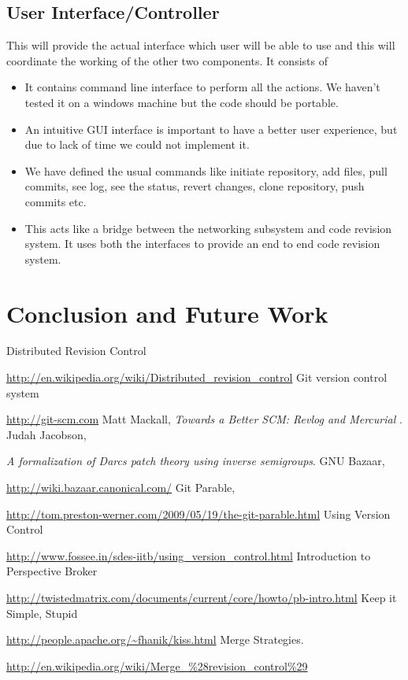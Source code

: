 \documentclass[12pt]{article}
\begin{document}
\subsection{User Interface/Controller}
This will provide the actual interface which user will be able to use and this
will coordinate the working of the other two components.
It consists of
\begin{itemize}
\item It contains command line interface to perform all the actions. We
  haven't tested it on a windows machine but the code should be portable.
\item An intuitive GUI interface is important to have a better user
  experience, but due to lack of time we could not implement it.
\item We have defined the usual commands like initiate repository, add files,
  pull commits, see log, see the status, revert changes, clone repository,
  push commits etc.
\item This acts like a bridge between the networking subsystem and code
  revision system. It uses both the interfaces to provide an end to end code
  revision system.
\end{itemize}

\section{Conclusion and Future Work}
\begin{thebibliography}{99}
Distributed Revision Control

\url{http://en.wikipedia.org/wiki/Distributed_revision_control}
Git version control system

\url{http://git-scm.com}
Matt Mackall, \emph{Towards a Better SCM: Revlog and Mercurial} .
Judah Jacobson,

\emph{A formalization of Darcs patch theory using inverse
  semigroups}.
GNU Bazaar,

\url{http://wiki.bazaar.canonical.com/}
Git Parable,

\url{http://tom.preston-werner.com/2009/05/19/the-git-parable.html}
Using Version Control

\url{http://www.fossee.in/sdes-iitb/using_version_control.html}
Introduction to Perspective Broker

\url{http://twistedmatrix.com/documents/current/core/howto/pb-intro.html}
Keep it Simple, Stupid

\url{http://people.apache.org/~fhanik/kiss.html}
Merge Strategies.

\url{http://en.wikipedia.org/wiki/Merge_%28revision_control%29}
\end{thebibliography}
\end{document}
